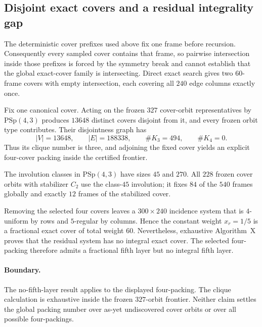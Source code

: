 \providecommand{\PSp}{\mathrm{PSp}}
\subsection*{Disjoint exact covers and a residual integrality gap}

The deterministic cover prefixes used above fix one frame before recursion.
Consequently every sampled cover contains that frame, so pairwise intersection
inside those prefixes is forced by the symmetry break and cannot establish that
the global exact-cover family is intersecting.  Direct exact search gives two
$60$-frame covers with empty intersection, each covering all $240$ edge columns
exactly once.

Fix one canonical cover.  Acting on the frozen $327$ cover-orbit
representatives by $\PSp(4,3)$ produces $13648$ distinct covers disjoint from it,
and every frozen orbit type contributes.  Their disjointness graph has
\[
 |V|=13648,\qquad |E|=188338,\qquad \#K_3=494,\qquad \#K_4=0.
\]
Thus its clique number is three, and adjoining the fixed cover yields an
explicit four-cover packing inside the certified frontier.

The involution classes in $\PSp(4,3)$ have sizes $45$ and $270$.  All $228$
frozen cover orbits with stabilizer $C_2$ use the class-$45$ involution; it fixes
$84$ of the $540$ frames globally and exactly $12$ frames of the stabilized
cover.

Removing the selected four covers leaves a $300\times240$ incidence system that
is $4$-uniform by rows and $5$-regular by columns.  Hence the constant weight
$x_r=1/5$ is a fractional exact cover of total weight $60$.  Nevertheless,
exhaustive Algorithm~X proves that the residual system has no integral exact
cover.  The selected four-packing therefore admits a fractional fifth layer but
no integral fifth layer.

\paragraph{Boundary.}
The no-fifth-layer result applies to the displayed four-packing.  The clique
calculation is exhaustive inside the frozen $327$-orbit frontier.  Neither claim
settles the global packing number over as-yet undiscovered cover orbits or over
all possible four-packings.
